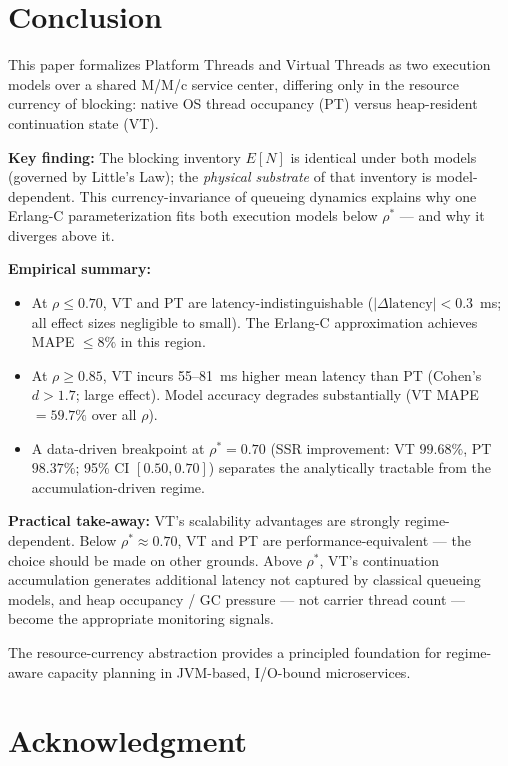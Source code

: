\documentclass[10pt]{article}
\begin{document}
\section{Conclusion}

This paper formalizes Platform Threads and Virtual Threads as two execution models over a shared M/M/c service center, differing only in the resource currency of blocking: native OS thread occupancy (PT) versus heap-resident continuation state (VT).

\textbf{Key finding:} The blocking inventory $E[N]$ is identical under both models (governed by Little's Law); the \emph{physical substrate} of that inventory is model-dependent. This currency-invariance of queueing dynamics explains why one Erlang-C parameterization fits both execution models below $\rho^*$ --- and why it diverges above it.

\textbf{Empirical summary:}
\begin{itemize}
\item At $\rho \leq 0.70$, VT and PT are latency-indistinguishable ($|\Delta\text{latency}| < 0.3$~ms; all effect sizes negligible to small). The Erlang-C approximation achieves MAPE $\leq 8\%$ in this region.
\item At $\rho \geq 0.85$, VT incurs 55--81~ms higher mean latency than PT (Cohen's $d > 1.7$; large effect). Model accuracy degrades substantially (VT MAPE $= 59.7\%$ over all $\rho$).
\item A data-driven breakpoint at $\rho^* = 0.70$ (SSR improvement: VT $99.68\%$, PT $98.37\%$; 95\% CI $[0.50, 0.70]$) separates the analytically tractable from the accumulation-driven regime.
\end{itemize}

\textbf{Practical take-away:} VT's scalability advantages are strongly regime-dependent. Below $\rho^* \approx 0.70$, VT and PT are performance-equivalent --- the choice should be made on other grounds. Above $\rho^*$, VT's continuation accumulation generates additional latency not captured by classical queueing models, and heap occupancy / GC pressure --- not carrier thread count --- become the appropriate monitoring signals.

The resource-currency abstraction provides a principled foundation for regime-aware capacity planning in JVM-based, I/O-bound microservices.

\section*{Acknowledgment}
\end{document}
